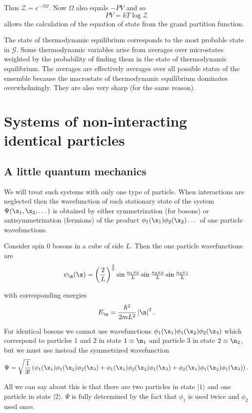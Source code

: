 \documentclass{notes}
\newcommand{\cZ}{\mathcal{Z}}
\newcommand{\cG}{\mathcal{G}}
\newcommand{\ket}[1]{|#1\rangle}
\begin{document}
Thus $\cZ = e^{-\beta \Omega}$.  Now $\Omega$ also equals $- PV$ and so
\begin{equation}\label{eq:gpfstate1}
PV = k T \log \cZ
\end{equation}
allows the calculation of the equation of state from the grand partition
function.

The state of thermodynamic equilibrium corresponds to the most probable
state in $\cG$.  Some thermodynamic variables arise from averages
over microstates weighted by the probability of finding them in the
state of thermodynamic equilibrium.  The averages are effectively
averages over all possible states of the ensemble because the macrostate
of thermodynamic equilibrium dominates overwhelmingly.  They are also very
sharp (for the same reason).

\section{Systems of non-interacting identical particles}

\subsection{A little quantum mechanics}

We will treat such systems with only one type of particle.  When
interactions are neglected then the wavefunction of each stationary
state of the system $\Psi(\x_1,\x_2,\dots)$ is obtained by either
symmetrization (for bosons) or antisymmetrization (fermions) of the
product $\phi_1(\x_1)\phi_2(\x_2)\dots$ of one particle wavefunctions.

Consider spin $0$ bosons in a cube of side $L$.  Then the
one particle wavefunctions are
\[
\psi_\n(\x) = \left( \frac{2}{L}\right)^{\frac{3}{2}}
\sin\tfrac{n_1 \pi x}{L} \sin\tfrac{n_2 \pi x}{L} \sin \tfrac{n_3 \pi z}{L}
\]

with corresponding energies
\[
E_\n = \frac{\hbar^2}{2 m L^2} \abs{\n}^2.
\]

For identical bosons we cannot use wavefunctions
$\phi_1(\x_1) \phi_1(\x_2) \phi_2(\x_3)$ which correspond to
particles $1$ and $2$ in state $1 \equiv \n_1$ and
particle $3$ in state $2 \equiv \n_2$, but we must
use instead the symmetrized wavefunction
\[
\Psi = \sqrt{\frac{1}{3!}} \left(
\phi_1(\x_1) \phi_1(\x_2) \phi_2(\x_3)
+ \phi_1(\x_1) \phi_2(\x_2) \phi_1(\x_3)
+ \phi_2(\x_1) \phi_1(\x_2) \phi_1(\x_3)
\right).
\]

All we can say about this is that there are two particles in state
$\ket{1}$ and one particle in state $\ket{2}$. $\Psi$ is fully
determined by the fact that $\phi_1$ is used twice and $\phi_2$ used
once.
\end{document}
